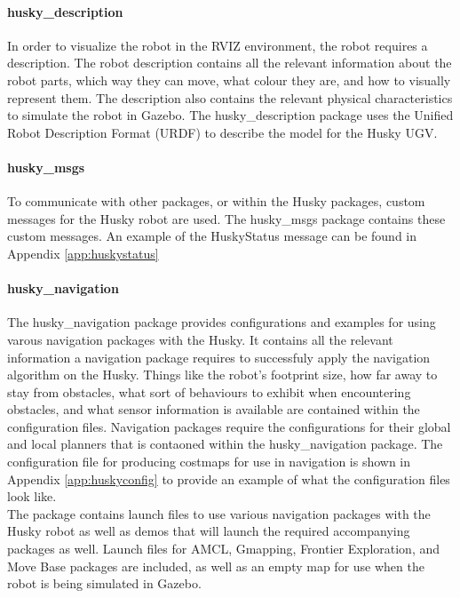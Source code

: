 \paragraph{husky\_description}

In order to visualize the robot in the RVIZ environment, the robot requires a description. The robot description contains all the relevant information about the robot parts, which way they can move, what colour they are, and how to visually represent them. The description also contains the relevant physical characteristics to simulate the robot in Gazebo. The husky\_description package uses the Unified Robot Description Format (URDF) to describe the model for the Husky UGV.\\

\paragraph{husky\_msgs}

To communicate with other packages, or within the Husky packages, custom messages for the Husky robot are used. The husky\_msgs package contains these custom messages. An example of the HuskyStatus message can be found in Appendix \ref{app:huskystatus}


\paragraph{husky\_navigation}

The husky\_navigation package provides configurations and examples for using varous navigation packages with the Husky. It contains all the relevant information a navigation package requires to successfuly apply the navigation algorithm on the Husky. Things like the robot's footprint size, how far away to stay from obstacles, what sort of behaviours to exhibit when encountering obstacles, and what sensor information is available are contained within the configuration files. Navigation packages require the configurations for their global and local planners that is contaoned within the husky\_navigation package. The configuration file for producing costmaps for use in navigation is shown in Appendix \ref{app:huskyconfig} to provide an example of what the configuration files look like.\\

The package contains launch files to use various navigation packages with the Husky robot as well as demos that will launch the required accompanying packages as well. Launch files for AMCL, Gmapping, Frontier Exploration, and Move Base packages are included, as well as an empty map for use when the robot is being simulated in Gazebo.\\ 

